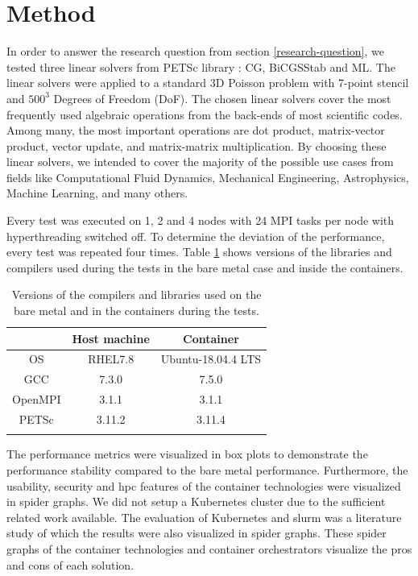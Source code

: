 \documentclass[12pt]{article}
\begin{document}
\section{Method}
In order to answer the research question from section \ref{research-question}, we tested three linear solvers from PETSc library \cite{PETSc2020overview}: CG, BiCGSStab and ML. The linear solvers were applied to a standard 3D Poisson problem with 7-point stencil and $500^3$ Degrees of Freedom (DoF). The chosen linear solvers cover the most frequently used algebraic operations from the back-ends of most scientific codes. Among many, the most important operations are dot product, matrix-vector product, vector update, and matrix-matrix multiplication. By choosing these linear solvers, we intended to cover the majority of the possible use cases from fields like Computational Fluid Dynamics, Mechanical Engineering, Astrophysics, Machine Learning, and many others.

Every test was executed on 1, 2 and 4 nodes with 24 MPI tasks per node with hyperthreading switched off. To determine the deviation of the performance, every test was repeated four times. Table \ref{tab:lib_verions} shows versions of the libraries and compilers used during the tests in the bare metal case and inside the containers.
\begin{table}[H]
    \centering
    \begin{tabular}{c c c}
        \hline
                & Host machine & Container \\ \hline
        OS      & RHEL7.8      & Ubuntu-18.04.4 LTS \\
        GCC     & 7.3.0        & 7.5.0 \\
        OpenMPI & 3.1.1        & 3.1.1 \\
        PETSc   & 3.11.2       & 3.11.4 \\ \\
    \end{tabular}
    \caption{Versions of the compilers and libraries used on the bare metal and in the containers during the tests.}
    \label{tab:lib_verions}
\end{table}

The performance metrics were visualized in box plots to demonstrate the performance stability compared to the bare metal performance. Furthermore, the usability, security and \gls{hpc} features of the container technologies were visualized in spider graphs. We did not setup a Kubernetes cluster due to the sufficient related work available. The evaluation of Kubernetes and \gls{slurm} was a literature study of which the results were also visualized in spider graphs. These spider graphs of the container technologies and container orchestrators visualize the pros and cons of each solution. 
\end{document}

